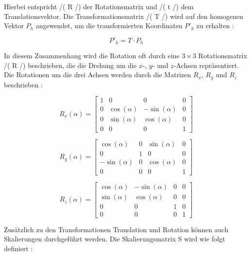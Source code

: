 Hierbei entspricht /( R /) der Rotationsmatrix und /( t /) dem Translationsvektor. Die Transformationsmatrix /( T /) wird auf den homogenen Vektor \(P_h\) angewendet, um die transformierten Koordinaten \(P'_h\) zu erhalten \cite{doerner2022virtual, gao2021vSLAM, freescale2010math3d}:

\begin{equation} 
    P'_h = T \cdot P_h \label{eq:transformationsmatrix}
\end{equation}

In diesem Zusammenhang wird die Rotation oft durch eine \(3\times3\) Rotationsmatrix /( R /) beschrieben, die die Drehung um die \(x\)-, \(y\)- und \(z\)-Achsen repräsentiert. Die Rotationen um die drei Achsen werden durch die Matrizen \(R_x\), \(R_y\) und \(R_z\) beschrieben \cite{doerner2022virtual, gao2021vSLAM, freescale2010math3d}:


\begin{equation}
    R_x(\alpha) =
    \begin{bmatrix}
        1 & 0 & 0 & 0 \\
        0 & \cos(\alpha) & -\sin(\alpha) & 0 \\
        0 & \sin(\alpha) & \cos(\alpha) & 0 \\
        0 & 0 & 0 & 1
    \end{bmatrix}
\end{equation}

\begin{equation}
    R_y(\alpha) =
    \begin{bmatrix}
        \cos(\alpha) & 0 & \sin(\alpha) & 0 \\
        0 & 1 & 0 & 0 \\
        -\sin(\alpha) & 0 & \cos(\alpha) & 0 \\
        0 & 0 & 0 & 1
    \end{bmatrix}
\end{equation}

\begin{equation}
    R_z(\alpha) =
    \begin{bmatrix}
        \cos(\alpha) & -\sin(\alpha) & 0 & 0 \\
        \sin(\alpha) & \cos(\alpha) & 0 & 0 \\
        0 & 0 & 1 & 0 \\
        0 & 0 & 0 & 1
    \end{bmatrix}
\end{equation}

Zusätzlich zu den Transformationen Translation und Rotation können auch Skalierungen durchgeführt werden. Die Skalierungsmatrix S wird wie folgt definiert \cite{doerner2022virtual, gao2021vSLAM, freescale2010math3d}:

